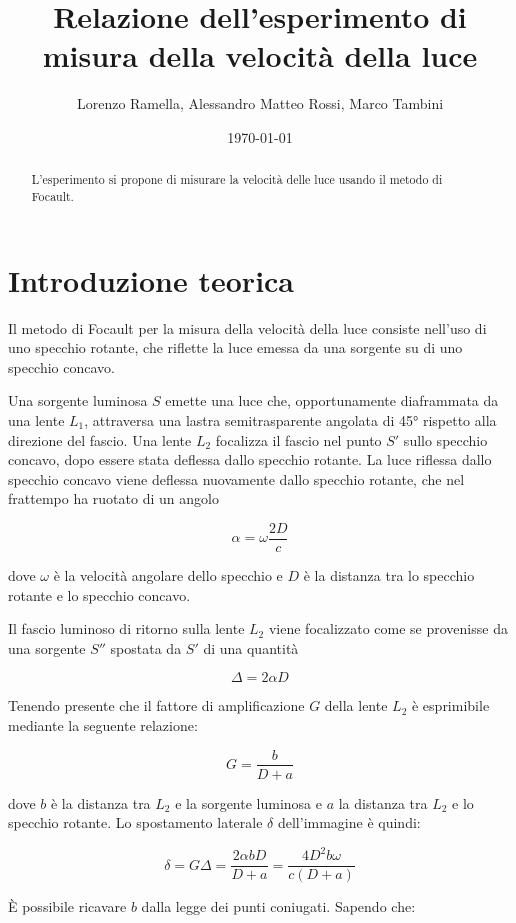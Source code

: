\documentclass{article}
\title{Relazione dell'esperimento di misura della velocità della luce}
\author{Lorenzo Ramella, Alessandro Matteo Rossi, Marco Tambini}
\date{\today}
\begin{document}
\maketitle


\begin{abstract}
L’esperimento si propone di misurare la velocità delle luce usando il metodo di Focault. %
\end{abstract}


\tableofcontents

\section{Introduzione teorica}
Il metodo di Focault per la misura della velocità della luce consiste nell'uso di uno specchio rotante, che riflette la luce emessa da una sorgente su di uno specchio concavo. 

Una sorgente luminosa $S$ emette una luce che, opportunamente diaframmata da una lente $L_1$, attraversa una lastra semitrasparente angolata di 45° rispetto alla direzione del fascio. Una lente $L_2$ focalizza il fascio nel punto $S'$ sullo specchio concavo, dopo essere stata deflessa dallo specchio rotante. La luce riflessa dallo specchio concavo viene deflessa nuovamente dallo specchio rotante, che nel frattempo ha ruotato di un angolo 

\[\alpha = \omega \frac{2D}{c}\]

dove $\omega$ è la velocità angolare dello specchio e $D$ è la distanza tra lo specchio rotante e lo specchio concavo.

Il fascio luminoso di ritorno sulla lente $L_2$ viene focalizzato come se provenisse da una sorgente $S''$ spostata da $S'$ di una quantità 

\[\Delta = 2 \alpha D\] 

Tenendo presente che il fattore di amplificazione $G$ della lente $L_2$ è esprimibile mediante la seguente relazione:

\[G=\frac{b}{D+a}\]

dove $b$ è la distanza tra $L_2$ e la sorgente luminosa e $a$  la distanza tra $L_2$ e lo specchio rotante. Lo spostamento laterale $\delta$ dell'immagine è quindi:

\[\delta = G\Delta =\frac{2\alpha b D}{D + a}=\frac{4 D^2 b \omega}{c(D+a)}\]

È possibile ricavare $b$ dalla legge dei punti coniugati. Sapendo che:
\end{document}
